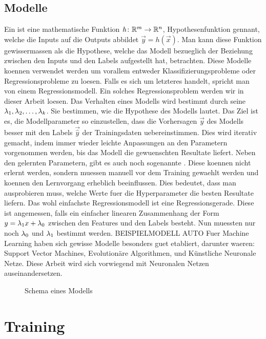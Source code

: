 \subsection{Modelle}
Ein  ist eine mathematische Funktion $\mathit{h}\colon \mathbb{R}^m
\to \mathbb{R}^n$, Hypothesenfunktion gennant, welche die Inputs auf die Outputs abbildet $\vec{y}=\mathit{h}(\vec{x})$.
Man kann diese Funktion gewissermassen als die Hypothese, welche das Modell bezueglich der Beziehung zwischen
den Inputs und den Labels aufgestellt hat, betrachten.
Diese Modelle koennen verwendet werden um vorallem entweder
Klassifizierungsprobleme oder Regressionsprobleme zu loesen. Falls es sich um
letzteres handelt, spricht man von einem Regressionsmodell. Ein solches
Regressionsproblem werden wir in dieser Arbeit loesen.
\para{}
Das Verhalten eines Modells wird bestimmt durch seine 
$\lambda_1, \lambda_2,\ldots,\lambda_k$. Sie bestimmen, wie die Hypothese des Modells lautet.
Das Ziel ist es, die Modellparameter so einzustellen, dass die Vorhersagen
$\vec{y}$ des Modells besser mit den Labels $\vec{\hat{y}}$ der Trainingsdaten uebereinstimmen.
Dies wird iterativ gemacht, indem immer wieder leichte Anpassungen an den
Parametern vorgenommen werden, bis das Modell die gewuenschten Resultate liefert.
\para{}
Neben den gelernten Parametern, gibt es auch noch sogenannte .
Diese koennen nicht erlernt werden, sondern muessen manuell vor dem Training gewaehlt werden und koennen den Lernvorgang erheblich beeinflussen.
Dies bedeutet, dass man ausprobieren muss, welche Werte fuer die Hyperparameter
die besten Resultate liefern.
\para{}
Das wohl einfachste Regressionsmodell ist eine Regressionsgerade. Diese ist
angemessen, falls ein einfacher linearen Zusammenhang der Form $y=\lambda_1x +
\lambda_0$ zwischen den Features und den Labels besteht.
Nun muessten nur noch $\lambda_0$ und $\lambda_1$ bestimmt werden.
BEISPIELMODELL AUTO
\para{}
Fuer Machine Learning haben sich gewisse Modelle besonders guet etabliert,
darunter waeren: Support Vector Machines, Evolutionäre Algorithmen, und Künstliche Neuronale Netze.
Diese Arbeit wird sich vorwiegend mit Neuronalen Netzen auseinandersetzen.
\\
\begin{figure}[h!]
  \centering


  \caption{Schema eines Modells}
\end{figure}

\section{Training}
